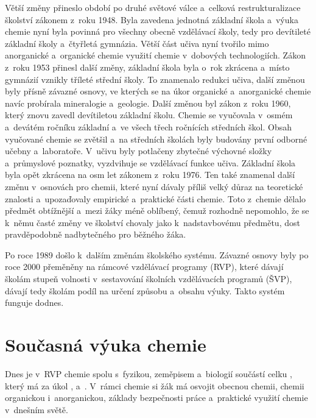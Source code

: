 Větší změny přineslo období po druhé světové válce a~celková restrukturalizace školství zákonem z~roku 1948. Byla zavedena jednotná základní škola a~výuka chemie nyní byla povinná pro všechny obecně vzdělávací školy, tedy pro devítileté základní školy a~čtyřletá gymnázia. Větší část učiva nyní tvořilo mimo anorganické a~organické chemie využití chemie v~dobových technologiích. Zákon z~roku 1953 přinesl další změny, základní škola byla o~rok zkrácena a~místo gymnázií vznikly tříleté střední školy. To znamenalo redukci učiva, další změnou byly přísně závazné osnovy, ve kterých se na úkor organické a~anorganické chemie navíc probírala mineralogie a~geologie. Další změnou byl zákon z~roku 1960, který znovu zavedl devítiletou základní školu. Chemie se vyučovala v~osmém a~devátém ročníku základní a~ve všech třech ročnících středních škol. Obsah vyučované chemie se zvětšil a~na středních školách byly budovány první odborné učebny a~laboratoře. V~učivu byly potlačeny zbytečné výchovné složky a~průmyslové poznatky, vyzdvihuje se vzdělávací funkce učiva. Základní škola byla opět zkrácena na osm let zákonem z~roku 1976. Ten také znamenal další změnu v~osnovách pro chemii, které nyní dávaly příliš velký důraz na teoretické znalosti a~upozaďovaly empirické a~praktické části chemie. Toto z~chemie dělalo předmět obtížnější a~mezi žáky méně oblíbený, čemuž rozhodně nepomohlo, že se k~němu časté změny ve školství chovaly jako k~nadstavbovému předmětu, dost pravděpodobně nadbytečného pro běžného žáka. \cite{historie_vyuky} \cite{u_nas_v_zahranici}

Po roce 1989 došlo k~dalším změnám školského systému. Závazné osnovy byly po roce 2000 přeměněny na rámcové vzdělávací programy (RVP), které dávají školám stupeň volnosti v~sestavování školních vzdělávacích programů (ŠVP), dávají tedy školám podíl na určení způsobu a~obsahu výuky. Takto systém funguje dodnes. \cite{u_nas_v_zahranici}

\section{Současná výuka chemie}
Dnes je v~RVP chemie spolu s~fyzikou, zeměpisem a~biologií součástí celku , který má za úkol  \cite{rvp_g}, a~. \cite{rvp_zv} V~rámci chemie si žák má osvojit obecnou chemii, chemii organickou i~anorganickou, základy bezpečnosti práce a~praktické využití chemie v~dnešním světě. \cite{rvp_g} \cite{rvp_zv}

